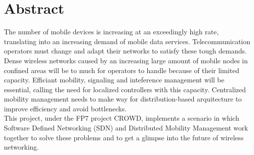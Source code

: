 \chapter*{Abstract}

The number of mobile devices is increasing at an exceedingly high rate, translating into an increasing demand of mobile data services. Telecommunication operators must change and adapt their networks to satisfy these tough demands. Dense wireless networks caused by an increasing large amount of mobile nodes in confined areas will be to much for operators to handle because of their limited capacity. Efficiant mobility, signaling and inteference management will be essential, calling the need for localized controllers with this capacity. Centralized mobility management needs to make way for distribution-based arquitecture to improve efficiency and avoid bottlenecks.\\

This project, under the FP7 project CROWD, implements a scenario in which Software Defined Networking (SDN) and Distributed Mobility Management work together to solve these problems and to get a glimpse into the future of wireless networking.


